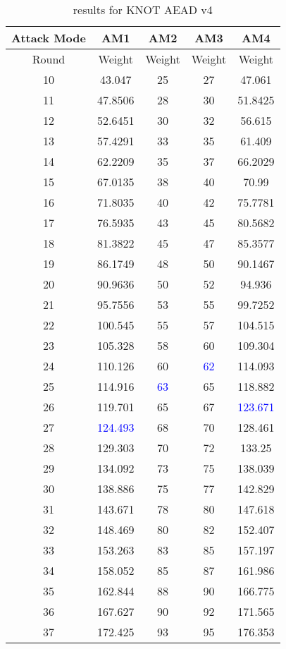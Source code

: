 \begin{table}
	\caption{results for KNOT AEAD v4}\label{tab:knot-aead-v4}
	\centering
	\begin{tabular}{|c|c|c|c|c|}
		\hline
		Attack Mode & AM1 & AM2 & AM3 & AM4\\
		\hline
		Round & Weight & Weight & Weight & Weight\\
		\hline
		10 & 43.047 & 25 & 27 & 47.061\\
		11 & 47.8506 & 28 & 30 & 51.8425\\
		12 & 52.6451 & 30 & 32 & 56.615\\
		13 & 57.4291 & 33 & 35 & 61.409\\
		14 & 62.2209 & 35 & 37 & 66.2029\\
		15 & 67.0135 & 38 & 40 & 70.99\\
		16 & 71.8035 & 40 & 42 & 75.7781\\
		17 & 76.5935 & 43 & 45 & 80.5682\\
		18 & 81.3822 & 45 & 47 & 85.3577\\
		19 & 86.1749 & 48 & 50 & 90.1467\\
		20 & 90.9636 & 50 & 52 & 94.936\\
		21 & 95.7556 & 53 & 55 & 99.7252\\
		22 & 100.545 & 55 & 57 & 104.515\\
		23 & 105.328 & 58 & 60 & 109.304\\
		24 & 110.126 & 60 & \textcolor{blue}{62} & 114.093\\
		25 & 114.916 & \textcolor{blue}{63} & 65 & 118.882\\
		26 & 119.701 & 65 & 67 & \textcolor{blue}{123.671}\\
		27 & \textcolor{blue}{124.493} & 68 & 70 & 128.461\\
		28 & 129.303 & 70 & 72 & 133.25\\
		29 & 134.092 & 73 & 75 & 138.039\\
		30 & 138.886 & 75 & 77 & 142.829\\
		31 & 143.671 & 78 & 80 & 147.618\\
		32 & 148.469 & 80 & 82 & 152.407\\
		33 & 153.263 & 83 & 85 & 157.197\\
		34 & 158.052 & 85 & 87 & 161.986\\
		35 & 162.844 & 88 & 90 & 166.775\\
		36 & 167.627 & 90 & 92 & 171.565\\
		37 & 172.425 & 93 & 95 & 176.353\\

\end{tabular}
\end{table}
